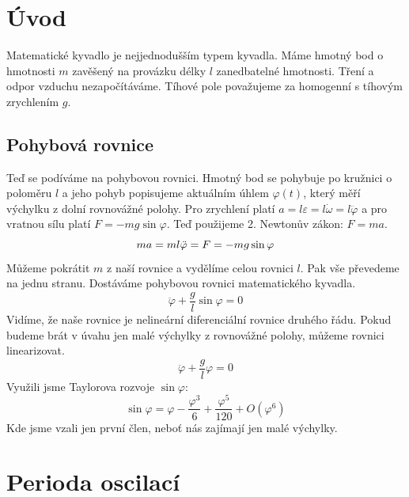 \section{Úvod}
\label{sec:Úvod}

Matematické kyvadlo je nejjednodušším typem kyvadla. Máme hmotný bod o hmotnosti $m$ zavěšený na provázku délky $l$ zanedbatelné hmotnosti. Tření a odpor vzduchu nezapočítáváme. Tíhové pole považujeme za homogenní s tíhovým zrychlením $g$.

\subsection*{Pohybová rovnice}
\label{sec:Pohybová rovnice}
Teď se podíváme na pohybovou rovnici. Hmotný bod se pohybuje po kružnici o poloměru $l$ a jeho pohyb popisujeme aktuálním úhlem $\varphi(t)$, který měří výchylku z dolní rovnovážné polohy. Pro zrychlení platí $a=l\varepsilon=l\dot{\omega}=l\ddot{\varphi}$ a pro vratnou sílu platí $F=-mg\sin\varphi$. Teď použijeme 2. Newtonův zákon: $F=ma$.
\begin{equation*}
ma=ml\ddot{\varphi}=F=-mg\sin\varphi\\
\end{equation*}
Můžeme pokrátit $m$ z naší rovnice a vydělíme celou rovnici $l$. Pak vše převedeme na jednu stranu. Dostáváme pohybovou rovnici matematického kyvadla.
\begin{equation}
\label{pohyb}
\boxed{\ddot{\varphi}+\frac{g}{l}\sin\varphi=0}
\end{equation}
Vidíme, že naše rovnice je nelineární diferenciální rovnice druhého řádu. Pokud budeme brát v úvahu jen malé výchylky z rovnovážné polohy, můžeme rovnici linearizovat.
\begin{equation}
\ddot{\varphi}+\frac{g}{l}\varphi=0
\end{equation}
Využili jsme Taylorova rozvoje $\sin\varphi$:
\begin{equation*}
\sin\varphi = \varphi-\frac{\varphi^3}{6}+\frac{\varphi^5}{120}+O\left(\varphi^6\right)
\end{equation*}
Kde jsme vzali jen první člen, neboť nás zajímají jen malé výchylky.

\section{Perioda oscilací}
\label{sec:Perioda oscilací}

